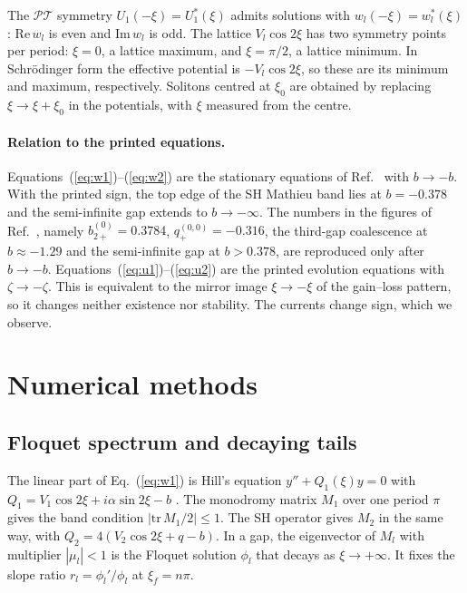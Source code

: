 \documentclass[pra,twocolumn,superscriptaddress,longbibliography]{revtex4-2}
\newcommand{\PT}{\mathcal{PT}}
\newcommand{\Img}{\mathrm{Im}\,}
\newcommand{\Rea}{\mathrm{Re}\,}
\begin{document}
The $\PT$ symmetry $U_1(-\xi) = U_1^{*}(\xi)$ admits solutions with $w_l(-\xi) = w_l^{*}(\xi)$:
$\Rea w_l$ is even and $\Img w_l$ is odd. The lattice $V_l\cos2\xi$ has two symmetry points per period: $\xi=0$, a lattice maximum, and
$\xi=\pi/2$, a lattice minimum. In Schr\"odinger form the effective potential is
$-V_l\cos2\xi$, so these are its minimum and maximum, respectively. Solitons centred at $\xi_0$ are
obtained by replacing $\xi\to\xi+\xi_0$ in the potentials, with $\xi$ measured from the centre.

\paragraph*{Relation to the printed equations.}
Equations~(\ref{eq:w1})--(\ref{eq:w2}) are the stationary equations of Ref.~\cite{MKM2013} with
$b\to-b$. With the printed sign, the top edge of the SH Mathieu band lies at $b=-0.378$ and the
semi-infinite gap extends to $b\to-\infty$. The numbers in the figures of Ref.~\cite{MKM2013},
namely $b_{2+}^{(0)} = 0.3784$, $q_+^{(0,0)} = -0.316$, the third-gap coalescence at
$b\approx-1.29$ and the semi-infinite gap at $b > 0.378$, are reproduced only after $b\to-b$.
Equations~(\ref{eq:u1})--(\ref{eq:u2}) are the printed evolution equations with $\zeta\to-\zeta$.
This is equivalent to the mirror image $\xi\to-\xi$ of the gain--loss pattern, so it changes
neither existence nor stability. The currents change sign, which we observe.

\section{Numerical methods}\label{sec:methods}

\subsection{Floquet spectrum and decaying tails}
The linear part of Eq.~(\ref{eq:w1}) is Hill's equation $y''+Q_1(\xi)y=0$ with
$Q_1 = V_1\cos2\xi+i\alpha\sin2\xi-b$ \cite{MagnusWinkler1966}. The monodromy matrix $M_1$ over one
period $\pi$ gives the band condition $|\mathrm{tr}\,M_1/2|\le1$. The SH operator gives $M_2$ in
the same way, with $Q_2 = 4(V_2\cos2\xi+q-b)$. In a gap, the eigenvector of $M_l$ with multiplier
$|\mu_l|<1$ is the Floquet solution $\phi_l$ that decays as $\xi\to+\infty$. It fixes the slope
ratio $r_l = \phi_l'/\phi_l$ at $\xi_f = n\pi$.
\end{document}
